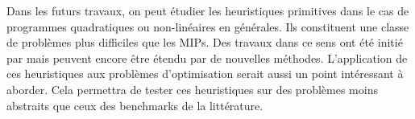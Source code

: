\documentclass[12pt,a4paper,oneside]{book}
\theoremstyle{definition}
\begin{document}
	Dans les futurs travaux, on peut étudier les heuristiques primitives dans le cas de programmes quadratiques ou non-linéaires en générales. Ils constituent une classe de problèmes plus difficiles que les MIPs. Des travaux dans ce sens ont été initié par \cite{Berthold2014} mais peuvent encore être étendu par de nouvelles méthodes. L'application de ces heuristiques aux problèmes d'optimisation serait aussi un point intéressant à aborder. Cela permettra de tester ces heuristiques sur des problèmes moins abstraits que ceux des benchmarks de la littérature.
	
	\newpage
	
	 
	
\end{document}
